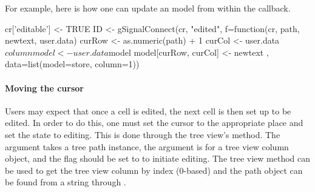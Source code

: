 For example, here is how one can update an  model
from within the callback.
\begin{Schunk}
\begin{Sinput}
 cr['editable'] <- TRUE
 ID <- gSignalConnect(cr, "edited", 
                      f=function(cr, path, newtext, user.data) {
                        curRow <- as.numeric(path) + 1
                        curCol <- user.data$column
                        model <- user.data$model
                        model[curRow, curCol] <- newtext
                      }, data=list(model=store, column=1))
\end{Sinput}
\end{Schunk}

\paragraph{Moving the cursor}
Users may expect that once a cell is edited, the next cell is then set
up to be edited. In order to do this, one must set the cursor to the
appropriate place and set the state to editing. This is done through
the tree view's  method. The
 argument takes a tree path instance, the 
argument is for a tree view column object, and the flag
 should be set to  to initiate
editing. The tree view method  can be
used to get the tree view column by index ($0$-based) and the path
object can be found from a string through .



